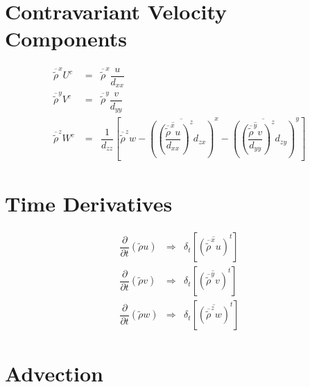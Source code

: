 \section{Contravariant Velocity Components}

\begin{eqnarray}
\overline{\tilde{\rho}}^{x} U^{c} \;  &  = & \overline{\tilde{\rho}}^{x} \dfrac{ u }{ d_{xx}} \\
\overline{\tilde{\rho}}^{y} V^{c} \;  &  = & \overline{\tilde{\rho}}^{y} \dfrac{ v }{ d_{yy}} \\
\overline{\tilde{\rho}}^{z} W^{c} \;  & = & \dfrac{1}{d_{zz}}
\left[\overline{\tilde{\rho}}^{z}  w -
\overline{\left( \overline{\left(
 \dfrac{\overline{\tilde{\rho}}^{x}  u }{d_{xx}} \right)}^{z}
d_{zx}\right)}^{x}
-  \overline{\left( \overline{\left(\dfrac{\overline{\tilde{\rho}}^{y}  v }{d_{yy}}
\right)}^{z}
d_{zy}\right)}^{y}\right]
\end{eqnarray}

\section{Time Derivatives}

\begin{eqnarray}
\dfrac{\partial}{\partial t}(\tilde{\rho}  u ) & \Longrightarrow &
\delta _{t } \left[ \overline{ \left( \overline{\tilde{\rho}}^{x}  u
 \right)}^{t} \right]
 \\
\dfrac{\partial}{\partial t}(\tilde{\rho}  v ) & \Longrightarrow &
\delta _{t } \left[  \overline{ \left( \overline{ \tilde{\rho}}^{y}  v
 \right)}^{t}  \right]
 \\
  \dfrac{\partial}{\partial t}(\tilde{\rho} w) & \Longrightarrow &
\delta_{t } \left[
\overline{ \left( \overline{\tilde{\rho}}^{z} w  \right)}^{t} \right]
\end{eqnarray}

\section{Advection}

